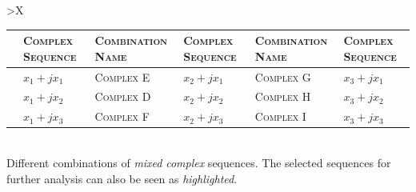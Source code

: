 \documentclass[../../course]{subfiles}
\begin{document}
\begin{center}

    \renewcommand{\arraystretch}{1.5}
    \begin{tabularx} {\textwidth} {
            *{1}{>{\centering\arraybackslash}X}
        }

        {\begin{tabularx} {\textwidth} {
                *{6}{>{\color{fgcol!50!bgcol}\centering\arraybackslash}m{}}
            }

            \toprule
            {\color{fgcol}\textsc{Combination Name}} & {\color{fgcol}\textsc{Complex Sequence}} &
            {\color{fgcol}\textsc{Combination Name}} & {\color{fgcol}\textsc{Complex Sequence}} &
            {\color{fgcol}\textsc{Combination Name}} & {\color{fgcol}\textsc{Complex Sequence}} \\
            \midrule

            {\color{fgcol}\textsc{Complex A}} & {\color{fgcol}$x_{1} + j x_{1}$} &
            \textsc{Complex E} & $x_{2} + j x_{1}$ &
            \textsc{Complex G} & $x_{3} + j x_{1}$ \\

            {\color{fgcol}\textsc{Complex B}} & {\color{fgcol}$x_{1} + j x_{2}$} &
            \textsc{Complex D} & $x_{2} + j x_{2}$ &
            \textsc{Complex H} & $x_{3} + j x_{2}$ \\

            {\color{fgcol}\textsc{Complex C}} & {\color{fgcol}$x_{1} + j x_{3}$} &
            {\color{fgcol}\textsc{Complex F}} & {\color{fgcol}$x_{2} + j x_{3}$} &
            \textsc{Complex I} & $x_{3} + j x_{3}$ \\

            \bottomrule

        \end{tabularx} } \\

         {
            Different combinations of \emph{mixed} \emph{complex} sequences.
            The selected sequences for further analysis can also be seen as \emph{highlighted}.
        }
        \label{tbl:cplxSeqs}
        \\

    \end{tabularx}

\end{center}

%
\end{document}
